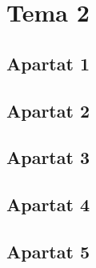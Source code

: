 \section{Tema 2}
\subsection{Apartat 1}

\subsection{Apartat 2}

\subsection{Apartat 3}

\subsection{Apartat 4}

\subsection{Apartat 5}
